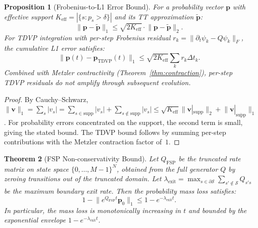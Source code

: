 \documentclass[11pt]{article}
\newtheorem{theorem}{Theorem}
\newtheorem{proposition}[theorem]{Proposition}
\newcommand{\norm}[1]{\lVert #1 \rVert}
\newcommand{\calS}{\mathcal{S}}
\begin{document}
\begin{proposition}[Frobenius-to-L1 Error Bound]\label{prop:frob-l1}
For a probability vector $\mathbf{p}$ with effective support
$K_{\mathrm{eff}} = |\{s : p_s > \delta\}|$ and its TT approximation
$\tilde{\mathbf{p}}$:
\begin{equation}
  \norm{\mathbf{p} - \tilde{\mathbf{p}}}_1
  \leq \sqrt{2 K_{\mathrm{eff}}} \cdot
  \norm{\mathbf{p} - \tilde{\mathbf{p}}}_2.
\end{equation}
For TDVP integration with per-step Frobenius residual
$r_k = \norm{\partial_t \psi_k - Q\psi_k}_F$,
the cumulative L1 error satisfies:
\begin{equation}
  \norm{\mathbf{p}(t) - \mathbf{p}_{\mathrm{TDVP}}(t)}_1
  \leq \sqrt{2 K_{\mathrm{eff}}} \sum_k r_k \Delta t_k.
\end{equation}
Combined with Metzler contractivity (Theorem~\ref{thm:contraction}),
per-step TDVP residuals do not amplify through subsequent evolution.
\end{proposition}

\begin{proof}
By Cauchy--Schwarz, $\norm{\mathbf{v}}_1 = \sum_s |v_s|
= \sum_{s \in \mathrm{supp}} |v_s| + \sum_{s \notin \mathrm{supp}} |v_s|
\leq \sqrt{K_{\mathrm{eff}}} \norm{\mathbf{v}|_{\mathrm{supp}}}_2
+ \norm{\mathbf{v}|_{\overline{\mathrm{supp}}}}_1$.
For probability errors concentrated on the support, the second term
is small, giving the stated bound.
The TDVP bound follows by summing per-step contributions with the
Metzler contraction factor of~$1$.
\end{proof}


\begin{theorem}[FSP Non-conservativity Bound]\label{thm:fsp-noncons}
Let $Q_{\mathrm{FSP}}$ be the truncated rate matrix on state space
$\{0,\ldots,M{-}1\}^N$, obtained from the full generator $Q$ by
zeroing transitions out of the truncated domain.
Let $\lambda_{\mathrm{exit}} = \max_{s \in \partial\calS}
\sum_{s' \notin \calS} Q_{s's}$ be the maximum boundary exit rate.
Then the probability mass loss satisfies:
\begin{equation}\label{eq:noncons}
  1 - \norm{e^{Q_{\mathrm{FSP}} t}\mathbf{p}_0}_1
  \leq 1 - e^{-\lambda_{\mathrm{exit}} t}.
\end{equation}
In particular, the mass loss is monotonically increasing in $t$
and bounded by the exponential envelope $1 - e^{-\lambda_{\mathrm{exit}} t}$.
\end{theorem}
\end{document}
